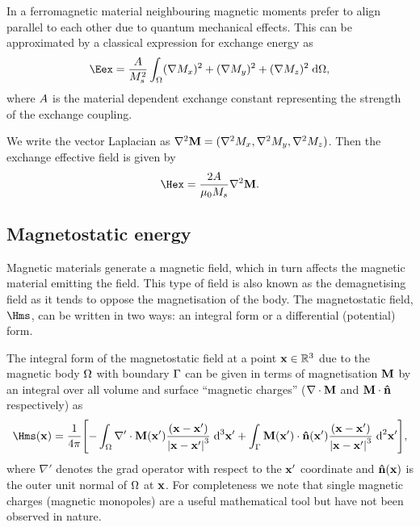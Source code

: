 In a ferromagnetic material neighbouring magnetic moments prefer to align parallel to each other due to quantum mechanical effects. 
This can be approximated by a classical expression for exchange energy \cite{Aharoni1996} as
\begin{equation}
  \label{eq:39}
  \Eex =  \frac{\Exchc}{M_s^2} \int_{\magd} (\nabla M_x)^2  + (\nabla M_y)^2  + (\nabla M_z)^2 \d \magd,
\end{equation}
where $A$ is the material dependent exchange constant representing the strength of the exchange coupling.

We write the vector Laplacian as $\nabla^2 \mathbf{M} = (\nabla^2 M_x,\nabla^2 M_y, \nabla^2 M_z )$. 
Then the exchange effective field is given by
\begin{equation}
  \label{eq:Hex}
  \Hex = \frac{2 \Exchc}{ \mu_0 M_s} \lap \Mv.
\end{equation}


\subsection{Magnetostatic energy}
\label{sec:magnetostatic-field}

Magnetic materials generate a magnetic field, which in turn affects the magnetic material emitting the field. 
This type of field is also known as the demagnetising field as it tends to oppose the magnetisation of the body. 
The magnetostatic field, $\Hms$, can be written in two ways: an integral form or a differential (potential) form. 

The integral form of the magnetostatic field at a point $\mathbf{x} \in \mathbb{R}^3$ due to the magnetic body $\Omega$ with boundary ${\Gamma}$ can be given in terms of magnetisation $\mathbf{M}$ by an integral over all volume and surface ``magnetic charges'' ($\nabla \cdot \mathbf{M}$ and $\mathbf{M} \cdot \mathbf{\hat{n}}$ respectively) as
\begin{equation}
  \Hms(\xv) = \frac{1}{4 \pi} \bigs{ 
    - \int_\magd \nabla' \cdot \Mv(\xv') \frac{(\xv - \xv')}{\abs{\xv -\xv'}^3} \d^3 \xv'
    + \int_\boundd \Mv(\xv') \cdot \nv(\xv') \frac{(\xv - \xv')}{\abs{\xv - \xv'}^3} \d^2 \xv' },
  \label{eq:Hmsint}
\end{equation}
where $\nabla'$ denotes the grad operator with respect to the $\mathbf{x}'$ coordinate and $\mathbf{\hat{n}}(\mathbf{x})$ is the outer unit normal of $\Omega$ at $\mathbf{x}$.
For completeness we note that single magnetic charges (magnetic monopoles) are a useful mathematical tool but have not been observed in nature.

